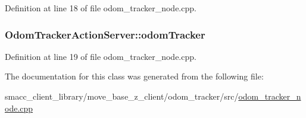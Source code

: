 Definition at line 18 of file odom\+\_\+tracker\+\_\+node.\+cpp.

\subsubsection[{\texorpdfstring{odom\+Tracker}{odomTracker}}]{ Odom\+Tracker\+Action\+Server\+::odom\+Tracker}\hypertarget{classOdomTrackerActionServer_a3e5c4328d3206fbd2fd2708f0aefe651}{}\label{classOdomTrackerActionServer_a3e5c4328d3206fbd2fd2708f0aefe651}


Definition at line 19 of file odom\+\_\+tracker\+\_\+node.\+cpp.



The documentation for this class was generated from the following file\+:\begin{DoxyCompactItemize}
\item 
smacc\+\_\+client\+\_\+library/move\+\_\+base\+\_\+z\+\_\+client/odom\+\_\+tracker/src/\hyperlink{odom__tracker__node_8cpp}{odom\+\_\+tracker\+\_\+node.\+cpp}\end{DoxyCompactItemize}
